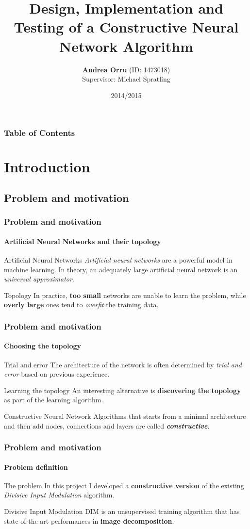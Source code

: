 \documentclass{beamer}
\title[Implementation of a Constructive Neural Network]{Design, Implementation and Testing of a Constructive Neural Network Algorithm}
\author[Andrea Orru]{\textbf{Andrea Orru} \small{(ID: 1473018)} \\ \small{Supervisor: Michael Spratling}}
\institute[King's College London]{Department of Informatics \\ King's College London}
\date{2014/2015}
\begin{document}
	\frame{\titlepage}
	
	\begin{frame}
		\frametitle{Table of Contents}
		\tableofcontents
	\end{frame}
	
	\section{Introduction}
		\subsection{Problem and motivation}
			\begin{frame}
				\frametitle{Problem and motivation}
				\framesubtitle{Artificial Neural Networks and their topology}
				\begin{block}{Artificial Neural Networks}
					\emph{Artificial neural networks} are a powerful model in machine learning. In theory, an adequately large artificial neural network is an \emph{universal approximator}.
				\end{block}
				\begin{alertblock}{Topology}
					In practice, \textbf{too small} networks are unable to learn the problem, while \textbf{overly large} ones tend to \emph{overfit} the training data.
				\end{alertblock}
			\end{frame}
			\begin{frame}
				\frametitle{Problem and motivation}
				\framesubtitle{Choosing the topology}
				\begin{block}{Trial and error}
					The architecture of the network is often determined by \emph{trial and error} based on previous experience.
				\end{block}
				\begin{block}{Learning the topology}
					An interesting alternative is \textbf{discovering the topology} as part of the learning algorithm.
				\end{block}
				\begin{exampleblock}{Constructive Neural Network}
					Algorithms that starts from a minimal architecture and then add nodes, connections and layers are called \textbf{\emph{constructive}}.
				\end{exampleblock}
			\end{frame}
			\begin{frame}
				\frametitle{Problem and motivation}
				\framesubtitle{Problem definition}
				\begin{exampleblock}{The problem}
					In this project I developed a \textbf{constructive version} of the existing \emph{Divisive Input Modulation} algorithm.
				\end{exampleblock}
				\begin{block}{Divisive Input Modulation}
					DIM is an unsupervised training algorithm that has state-of-the-art performances in \textbf{image decomposition}.
				\end{block}
			\end{frame}
		
\end{document}
